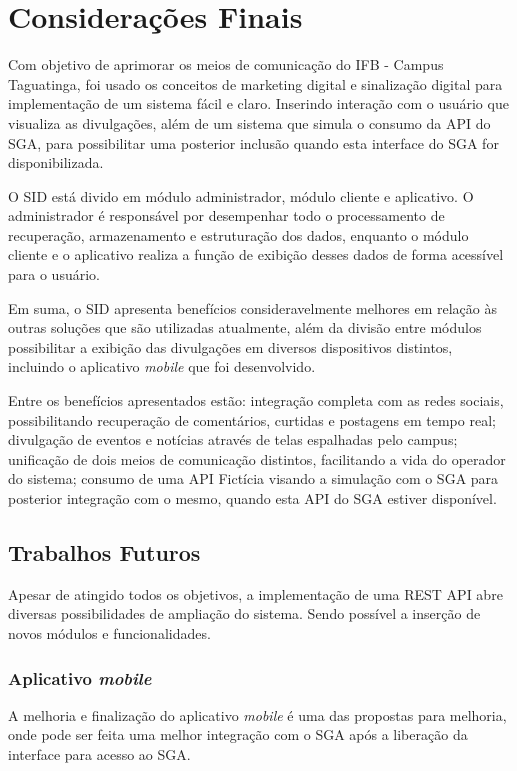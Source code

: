 

\chapter[Considerações Finais]{Considerações Finais}
\label{consideracoes}
Com objetivo de aprimorar os meios de comunicação do IFB - Campus Taguatinga, foi usado os conceitos de marketing digital e sinalização digital para implementação de um sistema fácil e claro. Inserindo interação com o usuário que visualiza as divulgações, além de um sistema que simula o consumo da API do SGA, para possibilitar uma posterior inclusão quando esta interface do SGA for disponibilizada.

O SID está divido em módulo administrador, módulo cliente e aplicativo. O administrador é responsável por desempenhar todo o processamento de recuperação, armazenamento e estruturação dos dados, enquanto o módulo cliente e o aplicativo realiza a função de exibição desses dados de forma acessível para o usuário.  

Em suma, o SID apresenta benefícios consideravelmente melhores em relação às outras soluções que são utilizadas atualmente, além da divisão entre módulos possibilitar a exibição das divulgações em diversos dispositivos distintos, incluindo o aplicativo \textit{mobile} que foi desenvolvido.

Entre os benefícios apresentados estão: integração completa com as redes sociais, possibilitando recuperação de comentários, curtidas e postagens em tempo real; divulgação de eventos e notícias através de telas espalhadas pelo campus; unificação de dois meios de comunicação distintos, facilitando a vida do operador do sistema; consumo de uma API Fictícia visando a simulação com o SGA para posterior integração com o mesmo, quando esta API do SGA estiver disponível.

\section{Trabalhos Futuros}
Apesar de atingido todos os objetivos, a implementação de uma REST API abre diversas possibilidades de ampliação do sistema. Sendo possível a inserção de novos módulos e funcionalidades.

\subsection{Aplicativo \textit{mobile}}
A melhoria e finalização do aplicativo \textit{mobile} é uma das propostas para melhoria, onde pode ser feita uma melhor integração com o SGA após a liberação da interface para acesso ao SGA.

